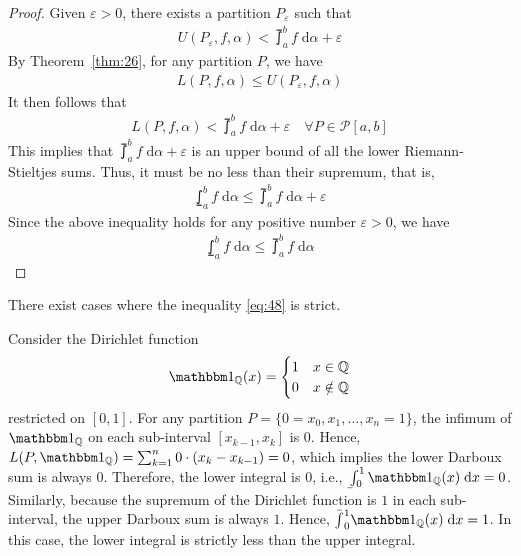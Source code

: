 \documentclass[thmcnt=section, 12pt]{my-elegantbook}
\begin{document}
\begin{proof}
    Given $\varepsilon > 0$, there exists a partition $P_\varepsilon$ such that 
    \begin{align*}
        U(P_\varepsilon,f,\alpha) < \upint_a^b f \; \mathrm{d}\alpha + \varepsilon
    \end{align*}
    By Theorem~\ref{thm:26}, for any partition $P$, we have 
    \begin{align*}
        L(P,f,\alpha) \leq U(P_\varepsilon,f,\alpha)
    \end{align*}
    It then follows that 
    \begin{align*}
        L(P,f,\alpha) < \upint_a^b f \; \mathrm{d}\alpha + \varepsilon
        \quad \forall P \in \mathcal{P}[a,b]
    \end{align*}
    This implies that $\upint_a^b f \; \mathrm{d}\alpha + \varepsilon$ is an upper bound of all the lower Riemann-Stieltjes sums. Thus, it must be no less than their supremum, that is, 
    \begin{align*}
        \lowint_a^b f \; \mathrm{d}\alpha
        \leq
        \upint_a^b f \; \mathrm{d}\alpha + \varepsilon
    \end{align*}
    Since the above inequality holds for any positive number $\varepsilon > 0$, we have 
    \begin{align*}
        \lowint_a^b f \; \mathrm{d}\alpha
        \leq \upint_a^b f \; \mathrm{d}\alpha
    \end{align*}
\end{proof}

There exist cases where the inequality \eqref{eq:48} is strict.

\begin{example}
    Consider the Dirichlet function
    \begin{align*}
        \ind_{\Q} (x) = \begin{cases}
            1 &x \in \Q\\ 
            0 &x \notin \Q
        \end{cases}
    \end{align*}
    restricted on $[0,1]$. For any partition $P = \{0=x_0, x_1, \ldots, x_n=1\}$, the infimum of $\ind_{\Q}$ on each sub-interval $[x_{k-1}, x_k]$ is $0$. Hence, $L(P,\ind_{\Q}) = \sum_{k=1}^n 0 \cdot (x_k - x_{k-1}) = 0$, which implies the lower Darboux sum is always $0$. Therefore, the lower integral is $0$, i.e., $\lowint_0^1 \ind_\Q(x) \; \mathrm{d}x = 0$. Similarly, because the supremum of the Dirichlet function is $1$ in each sub-interval, the upper Darboux sum is always $1$. Hence, $\upint_0^1 \ind_\Q(x) \; \mathrm{d}x = 1$. In this case, the lower integral is strictly less than the upper integral.
    \label{eg:5}
\end{example}
\end{document}
